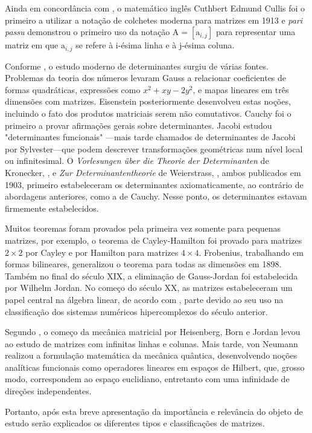 \documentclass[a4paper,12pt]{article}
\begin{document}
Ainda em concordância com \cite{STINSON}, o matemático inglês Cuthbert Edmund Cullis foi o primeiro a utilizar a notação de colchetes moderna para matrizes em 1913 e \textit{pari passu} demonstrou o primeiro uso da notação  $ \text{A} = [\text{a}_{ i,j}]$ para representar uma matriz em que $ \text{a}_{i,j} $ se refere à i-ésima linha e à j-ésima coluna.

Conforme \cite{KNOBLOCH}, o estudo moderno de determinantes surgiu de várias fontes. Problemas da teoria dos números levaram Gauss a relacionar coeficientes de formas quadráticas, expressões como $ x^{2} + xy - 2y^{2}$, e mapas lineares em três dimensões com matrizes. Eisenstein posteriormente desenvolveu estas noções, incluindo o fato dos produtos matriciais serem não comutativos. Cauchy foi o primeiro a provar afirmações gerais sobre determinantes. Jacobi estudou "determinantes funcionais" ---mais tarde chamados de determinantes de Jacobi por Sylvester---que podem descrever transformações geométricas num nível local ou infinitesimal. O \textit{Vorlesungen über die Theorie der Determinanten} de Kronecker, \cite{KRONECKER} , e \textit{Zur Determinantentheorie} de Weierstrass, \cite{WEIERSTRASS}, ambos publicados em 1903, primeiro estabeleceram os determinantes axiomaticamente, ao contrário de abordagens anteriores, como a de Cauchy. Nesse ponto, os determinantes estavam firmemente estabelecidos.

Muitos teoremas foram provados pela primeira vez somente para pequenas matrizes, por exemplo, o teorema de Cayley-Hamilton foi provado para matrizes $ 2 \times 2 $ por Cayley e por Hamilton para matrizes $ 4 \times 4 $. Frobenius, trabalhando em formas bilineares, generalizou o teorema para todas as dimensões em 1898. Também no final do século XIX, a eliminação de Gauss-Jordan foi estabelecida por Wilhelm Jordan. No começo do século XX, as matrizes estabeleceram um papel central na álgebra linear, de acordo com \cite{MAXIME},  parte devido ao seu uso na classificação dos sistemas numéricos hipercomplexos do século anterior.

Segundo \cite{MEHRA}, o começo da mecânica matricial por Heisenberg, Born e Jordan levou ao estudo de matrizes com infinitas linhas e colunas. Mais tarde, von Neumann realizou a formulação matemática da mecânica quântica, desenvolvendo noções analíticas funcionais como operadores lineares em espaços de Hilbert, que, grosso modo, correspondem ao espaço euclidiano, entretanto com uma infinidade de direções independentes.

Portanto, após esta breve apresentação da importância e relevância do objeto de estudo serão explicados os diferentes tipos e classificações de matrizes.
\end{document}
